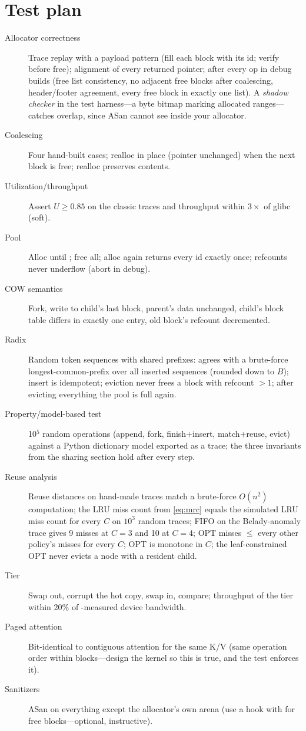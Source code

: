 \section{Test plan}

\begin{description}
  \item[Allocator correctness] Trace replay with a payload pattern (fill each block with its id; verify before free); alignment of every returned pointer;  after every op in debug builds (free list consistency, no adjacent free blocks after coalescing, header/footer agreement, every free block in exactly one list). A \emph{shadow checker} in the test harness---a byte bitmap marking allocated ranges---catches overlap, since ASan cannot see inside your allocator.
  \item[Coalescing] Four hand-built cases; realloc in place (pointer unchanged) when the next block is free; realloc preserves contents.
  \item[Utilization/throughput] Assert $U\ge 0.85$ on the classic traces and throughput within $3\times$ of glibc (soft).
  \item[Pool] Alloc until ; free all; alloc again returns every id exactly once; refcounts never underflow (abort in debug).
  \item[COW semantics] Fork, write to child's last block, parent's data unchanged, child's block table differs in exactly one entry, old block's refcount decremented.
  \item[Radix] Random token sequences with shared prefixes:  agrees with a brute-force longest-common-prefix over all inserted sequences (rounded down to $B$); insert is idempotent; eviction never frees a block with refcount $>1$; after evicting everything the pool is full again.
  \item[Property/model-based test] 10$^5$ random operations (append, fork, finish+insert, match+reuse, evict) against a Python dictionary model exported as a trace; the three invariants from the sharing section hold after every step.
  \item[Reuse analysis] Reuse distances on hand-made traces match a brute-force $O(n^2)$ computation; the LRU miss count from \eqref{eq:mrc} equals the simulated LRU miss count for every $C$ on $10^3$ random traces; FIFO on the Belady-anomaly trace gives 9 misses at $C=3$ and 10 at $C=4$; OPT misses $\le$ every other policy's misses for every $C$; OPT is monotone in $C$; the leaf-constrained OPT never evicts a node with a resident child.
  \item[Tier] Swap out, corrupt the hot copy, swap in, compare; throughput of the tier within 20\% of -measured device bandwidth.
  \item[Paged attention] Bit-identical to contiguous attention for the same K/V (same operation order within blocks---design the kernel so this is true, and the test enforces it).
  \item[Sanitizers] ASan on everything except the allocator's own arena (use a  hook with  for free blocks---optional, instructive).
\end{description}

